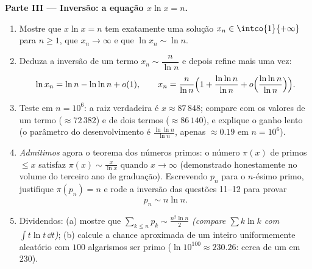 \begin{problem}
\medskip
\noindent\textbf{Parte III --- Inversão: a equação $x\ln x =
n$.}
\begin{enumerate}[resume]
  \item Mostre que $x\ln x = n$ tem exatamente uma solução $x_n \in
        \intco{1}{+\infty}$ para $n \geq 1$, que $x_n \to
        \infty$ e que $\ln x_n \sim \ln n$.
  \item Deduza a inversão de um termo $x_n \sim
        \dfrac{n}{\ln n}$ e depois refine mais uma vez:
        \[
        \ln x_n = \ln n - \ln\ln n + o(1),
        \qquad
        x_n = \frac{n}{\ln n}\Bigl(1 + \frac{\ln\ln n}{\ln n}
        + o\Bigl(\frac{\ln\ln n}{\ln n}\Bigr)\Bigr).
        \]
  \item Teste em $n = 10^6$: a raiz verdadeira é $x \approx
        87\,848$; compare com os valores de um termo ($\approx 72\,382$)
        e de dois termos ($\approx 86\,140$), e explique o
        ganho lento (o parâmetro do desenvolvimento é $\frac{\ln\ln
        n}{\ln n}$, apenas $\approx 0.19$ em $n = 10^6$).
  \item \emph{Admitimos} agora o teorema dos números primos: o número
        $\pi(x)$ de primos $\leq x$ satisfaz $\pi(x) \sim
        \frac{x}{\ln x}$ quando $x \to \infty$ (demonstrado honestamente no
        volume do terceiro ano de graduação). Escrevendo $p_n$ para o $n$-ésimo primo,
        justifique $\pi(p_n) = n$ e rode a inversão das
        questões 11--12 para provar
        \[
        p_n \sim n \ln n .
        \]
  \item Dividendos: (a) mostre que $\sum_{k \leq n} p_k \sim
        \frac{n^2\ln n}{2}$ \emph{(compare $\sum k\ln k$ com
        $\int t\ln t\,\dd t$)}; (b) calcule a chance aproximada
        de um inteiro uniformemente aleatório com $100$
        algarismos ser primo ($\ln 10^{100} \approx 230.26$: cerca de
        um em $230$).
\end{enumerate}


\end{problem}
